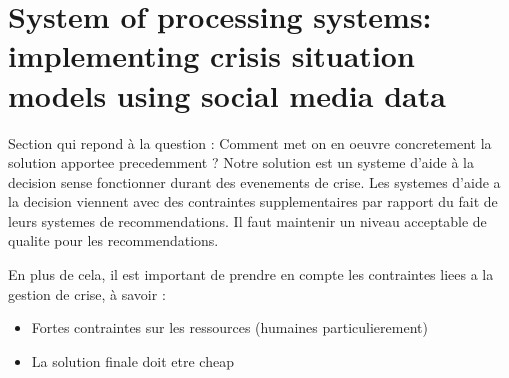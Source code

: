 \chapter{System of processing systems: implementing crisis situation models using social media data}





Section qui repond à la question : Comment met on en oeuvre concretement la solution apportee precedemment ?
Notre solution est un systeme d'aide à la decision sense fonctionner durant des evenements de crise.
Les systemes d'aide a la decision viennent avec des contraintes supplementaires par rapport du fait de leurs systemes de recommendations.
Il faut maintenir un niveau acceptable de qualite pour les recommendations.

En plus de cela, il est important de prendre en compte les contraintes liees a la gestion de crise, à savoir :
\begin{itemize}
    \item Fortes contraintes sur les ressources (humaines particulierement)
    \item La solution finale doit etre cheap
\end{itemize}

